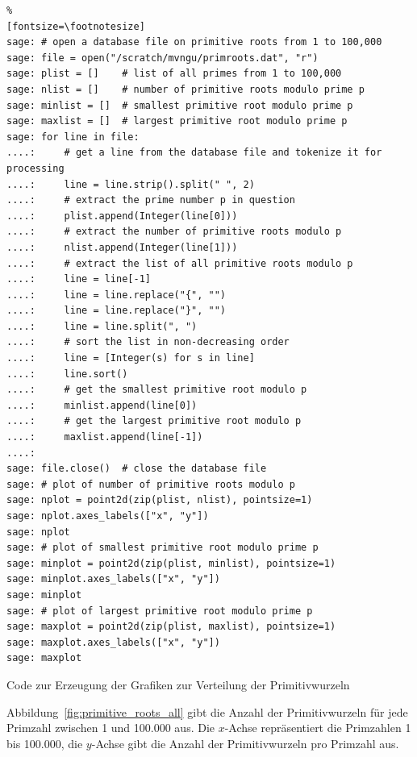\begin{refsegment}
\begin{sagecode}
\begin{Verbatim}%
[fontsize=\footnotesize]
sage: # open a database file on primitive roots from 1 to 100,000
sage: file = open("/scratch/mvngu/primroots.dat", "r")
sage: plist = []    # list of all primes from 1 to 100,000
sage: nlist = []    # number of primitive roots modulo prime p
sage: minlist = []  # smallest primitive root modulo prime p
sage: maxlist = []  # largest primitive root modulo prime p
sage: for line in file:
....:     # get a line from the database file and tokenize it for processing
....:     line = line.strip().split(" ", 2)
....:     # extract the prime number p in question
....:     plist.append(Integer(line[0]))
....:     # extract the number of primitive roots modulo p
....:     nlist.append(Integer(line[1]))
....:     # extract the list of all primitive roots modulo p
....:     line = line[-1]
....:     line = line.replace("{", "")
....:     line = line.replace("}", "")
....:     line = line.split(", ")
....:     # sort the list in non-decreasing order
....:     line = [Integer(s) for s in line]
....:     line.sort()
....:     # get the smallest primitive root modulo p
....:     minlist.append(line[0])
....:     # get the largest primitive root modulo p
....:     maxlist.append(line[-1])
....:
sage: file.close()  # close the database file
sage: # plot of number of primitive roots modulo p
sage: nplot = point2d(zip(plist, nlist), pointsize=1)
sage: nplot.axes_labels(["x", "y"])
sage: nplot
sage: # plot of smallest primitive root modulo prime p
sage: minplot = point2d(zip(plist, minlist), pointsize=1)
sage: minplot.axes_labels(["x", "y"])
sage: minplot
sage: # plot of largest primitive root modulo prime p
sage: maxplot = point2d(zip(plist, maxlist), pointsize=1)
sage: maxplot.axes_labels(["x", "y"])
sage: maxplot
\end{Verbatim}
\caption{Code zur Erzeugung der Grafiken zur Verteilung der Primitivwurzeln}
\label{l:Sagecode_Graphics-Distribution-PrimRoots}{}
\end{sagecode}




\newpage
Abbildung~\ref{fig:primitive_roots_all} gibt die Anzahl der Primitivwurzeln
für jede Primzahl zwischen 1 und 100.000 aus. Die $x$-Achse repräsentiert
die Primzahlen 1 bis 100.000, die $y$-Achse gibt die Anzahl der Primitivwurzeln
pro Primzahl aus.


\end{refsegment}
